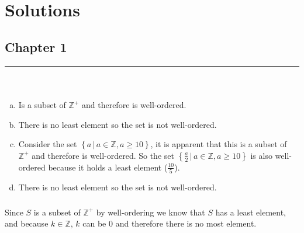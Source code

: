 \documentclass[class=article, crop=false]{standalone}
\def\integers{{\mathbb Z}}
\begin{document}
\setcounter{section}{0}
\section{Solutions}

\setcounter{subsection}{0}
\subsection{Chapter 1}
\rule{\textwidth}{1pt}\\
\subsubsection{}
\begin{enumerate}[(a)]
  \item
	Is a subset of $\integers^+$ and therefore is well-ordered.
  
	\item
	There is no least element so the set is not well-ordered.
  
	\item
	Consider the set $\left\{a\,\big|\, a\in\integers,a\geq 10\right\}$, it is apparent that this is a subset of $\integers^+$ and therefore is well-ordered.
	So the set $\left\{\frac a2\,\big|\, a\in\integers,a\geq 10\right\}$ is also well-ordered because it holds a least element ($\frac{10}{5}$).
  
	\item
	There is no least element so the set is not well-ordered.
  \end{enumerate}
\subsubsection{}
Since $S$ is a subset of $\integers^+$ by well-ordering we know that $S$ has a least element, and because $k\in\integers$,
$k$ can be $0$ and therefore there is no most element.
\end{document}
